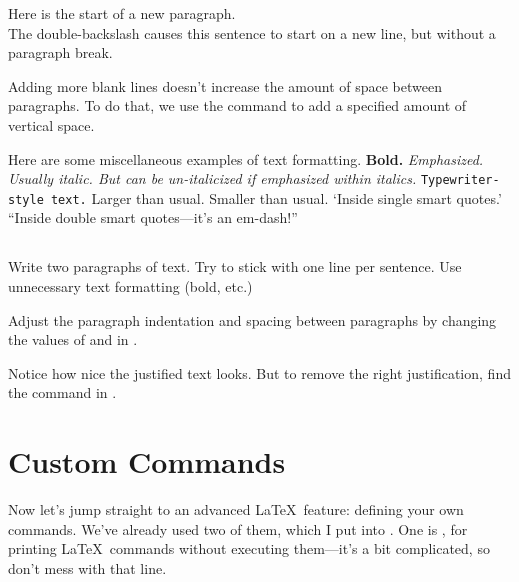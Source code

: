\documentclass{article}
\begin{document}
Here is the start of a new paragraph.  \\
The double-backslash causes this sentence to start on a new line, but without a paragraph break.

\vspace{20pt}
Adding more blank lines doesn't increase the amount of space between paragraphs.
To do that, we use the \latexcode{\\vspace} command to add a specified amount of vertical space.

Here are some miscellaneous examples of text formatting.
\textbf{Bold.}
\emph{Emphasized.  Usually italic.  But can be un-italicized if \emph{emphasized} within italics.}
\texttt{Typewriter-style text.}
\large{Larger than usual.}
\small{Smaller than usual.}
`Inside single smart quotes.'
``Inside double smart quotes---it's an em-dash!''

\subsection{\task}

Write two paragraphs of text.
Try to stick with one line per sentence.
Use unnecessary text formatting (bold, etc.)

Adjust the paragraph indentation and spacing between paragraphs by changing the values of \latexcode{\\parindent} and \latexcode{\\parskip} in .

Notice how nice the justified text looks.
But to remove the right justification, find the \latexcode{\\raggedright} command in .

\section{Custom Commands}
\label{sec:custom}

Now let's jump straight to an advanced \LaTeX\ feature: defining your own commands.
We've already used two of them, which I put into .
One is \latexcode{\\latexcode}, for printing \LaTeX\ commands without executing them---it's a bit complicated, so don't mess with that line.

\subsection{\task}
\end{document}
